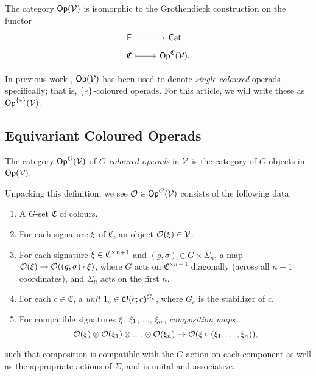 \documentclass[a4paper,10pt
,draft
]{article}%
\begin{document}
\begin{remark}
      The category $\mathsf{Op}(\mathcal V)$ is isomorphic to the Grothendieck construction on the functor
      \begin{equation}
            \begin{tikzcd}[row sep = tiny]
                  \mathsf F \arrow[r] & \mathsf{Cat}
                  \\
                  \mathfrak C \arrow[r, mapsto] & \Op^{\mathfrak C}(\V).
            \end{tikzcd}
      \end{equation}
\end{remark}

\begin{notation}
      In previous work , $\mathsf{Op}(\mathcal V)$ has been used to denote \textit{single-coloured} operads specifically; that is, $\set{\**}$-coloured operads.
      For this article, we will write these as $\Op^{\set{\**}}(\V)$. 
\end{notation}


\subsection{Equivariant Coloured Operads}

\begin{definition}
      The category $\mathsf{Op}^G(\mathcal V)$ of  \textit{$G$-coloured operads} in $\mathcal V$ is the category of
      $G$-objects in $\mathsf{Op}(\mathcal V)$.
\end{definition}


\begin{remark}
      Unpacking this definition, we see $\mathcal{O} \in \mathsf{Op}^G(\mathcal V)$ consists of the following data:
      \begin{enumerate}
      \item A $G$-set $\mathfrak C$ of colours.
      \item For each signature $\xi$ of $\mathfrak C$, an object $\mathcal{O}(\xi) \in \mathcal V$.
      \item For each signature $\xi \in \mathfrak C^{\times n+1}$ and $(g,\sigma) \in G\times \Sigma_n$, a map
            $\mathcal{O}(\xi) \to \mathcal{O}((g,\sigma)\cdot \xi)$,
            where $G$ acts on $\mathfrak C^{\times n+1}$ diagonally (across all $n+1$ coordinates), and $\Sigma_n$ acts on the first $n$.
      \item For each $c \in \mathfrak C$, a \textit{unit} $1_c \in \mathcal{O}(c;c)^{G_c}$, where $G_c$ is the stabilizer of $c$.
      \item For compatible signatures $\xi$, $\xi_1$, $\ldots$, $\xi_n$, \textit{composition maps}
            \begin{equation}
                  \mathcal{O}(\xi) \otimes \mathcal{O}(\xi_1) \otimes \ldots \otimes \mathcal{O}(\xi_n) \to \mathcal{O}(\xi \circ (\xi_1, \ldots, \xi_n)),
            \end{equation}
      \end{enumerate}
      such that composition is
      compatible with the $G$-action on each component as well as the appropriate actions of $\Sigma$,
      and is unital and associative. 
\end{remark}
\end{document}

